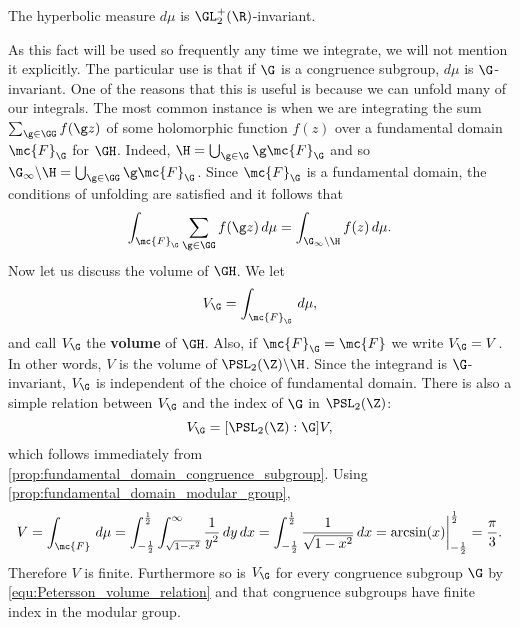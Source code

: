       \begin{proposition}
        The hyperbolic measure $d\mu$ is $\GL_{2}^{+}(\R)$-invariant.
      \end{proposition}

      As this fact will be used so frequently any time we integrate, we will not mention it explicitly. The particular use is that if $\G$ is a congruence subgroup, $d\mu$ is $\G$-invariant. One of the reasons that this is useful is because we can unfold many of our integrals. The most common instance is when we are integrating the sum $\sum_{\g \in \GG}f(\g z)$ of some holomorphic function $f(z)$ over a fundamental domain $\mc{F}_{\G}$ for $\GH$. Indeed, $\H = \bigcup_{\g \in \G}\g\mc{F}_{\G}$ and so $\G_{\infty}\backslash\H = \bigcup_{\g \in \GG}\g\mc{F}_{\G}$. Since $\mc{F}_{\G}$ is a fundamental domain, the conditions of unfolding are satisfied and it follows that
      \[
        \int_{\mc{F}_{\G}}\sum_{\g \in \GG}f(\g z)\,d\mu = \int_{\G_{\infty}\backslash\H}f(z)\,d\mu.
      \]
      Now let us discuss the volume of $\GH$. We let
      \[
        V_{\G} = \int_{\mc{F}_{\G}}\,d\mu,
      \]
      and call $V_{\G}$ the \textbf{volume} of $\GH$. Also, if $\mc{F}_{\G} = \mc{F}$ we write $V_{\G} = V$. In other words, $V$ is the volume of $\PSL_{2}(\Z)\backslash\H$. Since the integrand is $\G$-invariant, $V_{\G}$ is independent of the choice of fundamental domain. There is also a simple relation between $V_{\G}$ and the index of $\G$ in $\PSL_{2}(\Z)$:
      \begin{equation}\label{equ:Petersson_volume_relation}
        V_{\G} = [\PSL_{2}(\Z):\G]V,
      \end{equation}
      which follows immediately from \cref{prop:fundamental_domain_congruence_subgroup}. Using \cref{prop:fundamental_domain_modular_group},
      \[
        V = \int_{\mc{F}}\,d\mu = \int_{-\frac{1}{2}}^{\frac{1}{2}}\int_{\sqrt{1-x^{2}}}^{\infty}\frac{1}{y^{2}}\,dy\,dx = \int_{-\frac{1}{2}}^{\frac{1}{2}}\frac{1}{\sqrt{1-x^{2}}}\,dx = \arcsin(x)\bigg|_{-\frac{1}{2}}^{\frac{1}{2}} = \frac{\pi}{3}.
      \]
      Therefore $V$ is finite. Furthermore so is $V_{\G}$ for every congruence subgroup $\G$ by \cref{equ:Petersson_volume_relation} and that congruence subgroups have finite index in the modular group.